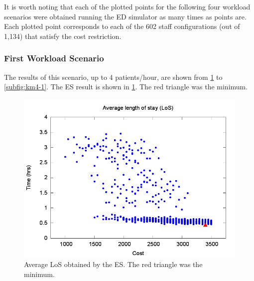 It is worth noting that each of the plotted points for the following
four workload scenarios were obtained running the ED simulator as
many times as points are. Each plotted point corresponds to each of
the 602 staff configurations (out of 1,134) that satisfy the cost
restriction.


\subsubsection{First Workload Scenario}

The results of this scenario, up to 4 patients/hour, are shown from
\ref{subfig:es4-1} to \ref{subfig:km4-1}. The ES result is shown
in \ref{subfig:es4-1}. The red triangle was the minimum. 
\begin{figure}[H]
\noindent \begin{centering}
\includegraphics[width=0.95\columnwidth,height=0.23\paperheight]{figs4/v0/6400-602-25-exh-LoS-min}
\par\end{centering}

\caption{Average LoS obtained by the ES. The red triangle was the minimum.
\label{subfig:es4-1}}
\end{figure}


